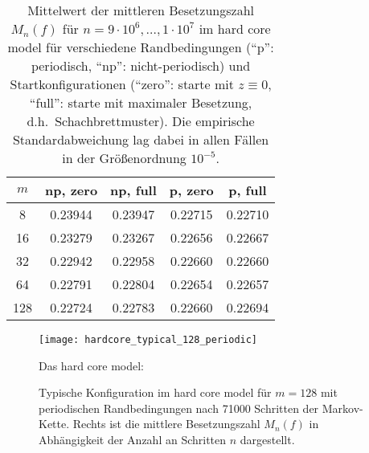\documentclass[twoside]{article}
\theoremstyle{definition}
\begin{document}
\begin{table}
\centering
\caption{Mittelwert der mittleren Besetzungszahl $M_n(f)$ für $n = 9 \cdot 10^6 , \dots , 1 \cdot 10^7$ im hard core model für verschiedene Randbedingungen (\enquote{p}: periodisch, \enquote{np}: nicht-periodisch) und Startkonfigurationen (\enquote{zero}: starte mit $z \equiv 0$, \enquote{full}: starte mit maximaler Besetzung, d.h.\ Schachbrettmuster). Die empirische Standardabweichung lag dabei in allen Fällen in der Größenordnung $10^{-5}$.}
\label{tab:hc}
\begin{tabular}{c||cc|cc}
\toprule
$m$ & np, zero & np, full & p, zero & p, full \\
\midrule
8 & 0.23944 & 0.23947 & 0.22715 & 0.22710\\
16 & 0.23279 & 0.23267 & 0.22656 & 0.22667\\
32 & 0.22942 & 0.22958 & 0.22660 & 0.22660\\
64 & 0.22791 & 0.22804 & 0.22654 & 0.22657\\
128 & 0.22724 & 0.22783 & 0.22660 & 0.22694\\
\bottomrule
\end{tabular}
\end{table}
\begin{figure}
\centering
\texttt{[image: hardcore\_typical\_128\_periodic]}
\caption{Typische Konfiguration im hard core model für $m=128$ mit periodischen Randbedingungen nach 71000 Schritten der Markov-Kette. Rechts ist die mittlere Besetzungszahl $M_n(f)$ in Abhängigkeit der Anzahl an Schritten $n$ dargestellt.}Das hard core model:
\end{figure}
\end{document}
